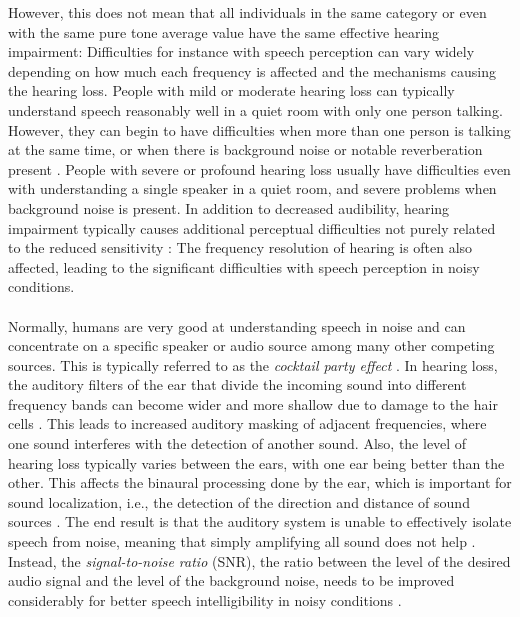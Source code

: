 \documentclass[english, 12pt, a4paper, pdftex, elec, utf8]{aaltothesis}
\begin{document}
However, this does not mean that all individuals in the same category or even with the same pure tone average value have the same effective hearing impairment: Difficulties for instance with speech perception can vary widely depending on how much each frequency is affected and the mechanisms causing the hearing loss. People with mild or moderate hearing loss can typically understand speech reasonably well in a quiet room with only one person talking. However, they can begin to have difficulties when more than one person is talking at the same time, or when there is background noise or notable reverberation present \cite{peterson2010cochlear}. People with severe or profound hearing loss usually have difficulties even with understanding a single speaker in a quiet room, and severe problems when background noise is present. In addition to decreased audibility, hearing impairment typically causes additional perceptual difficulties not purely related to the reduced sensitivity \cite{moore2007cochlear}: The frequency resolution of hearing is often also affected, leading to the significant difficulties with speech perception in noisy conditions. \\\\
Normally, humans are very good at understanding speech in noise and can concentrate on a specific speaker or audio source among many other competing sources. This is typically referred to as the \textit{cocktail party effect} \cite{bronkhorst2000cocktail}. In hearing loss, the auditory filters of the ear that divide the incoming sound into different frequency bands can become wider and more shallow due to damage to the hair cells \cite{moore2007cochlear}. This leads to increased auditory masking of adjacent frequencies, where one sound interferes with the detection of another sound. Also, the level of hearing loss typically varies between the ears, with one ear being better than the other. This affects the binaural processing done by the ear, which is important for sound localization, i.e., the detection of the direction and distance of sound sources \cite{moore2007cochlear, pulkki2015communication}. The end result is that the auditory system is unable to effectively isolate speech from noise, meaning that simply amplifying all sound does not help \cite[p.~233--234]{moore2007cochlear}. Instead, the \textit{signal-to-noise ratio} (SNR), the ratio between the level of the desired audio signal and the level of the background noise, needs to be improved considerably for better speech intelligibility in noisy conditions \cite{healy2016difficulty, fink2008benefit}.
\end{document}
